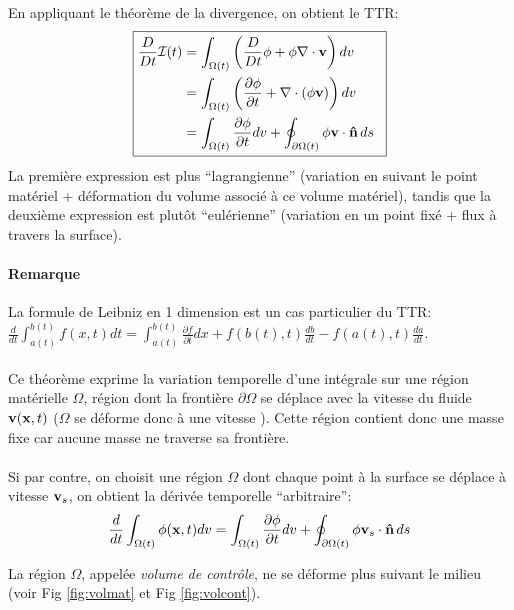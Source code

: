 En appliquant le théorème de la divergence, on obtient le TTR:
$$\boxed{
\begin{aligned}
\frac{D}{Dt}\mathcal{I}(t) &=\int_{\Omega (t)}\left(\frac{D}{Dt}\phi+\phi\nabla\cdot\textbf{v}\right)dv\qquad\\
 & =\int_{\Omega (t)}\left(\frac{\partial \phi}{\partial t}+\nabla\cdot(\phi\textbf{v})\right)dv\\
 & = \int_{\Omega (t)}\frac{\partial\phi}{\partial t}dv+\oint_{\partial \Omega (t)}\phi\textbf{v}\cdot\textbf{\^n}\,ds\\
\end{aligned}}$$
La première expression est plus ``lagrangienne'' (variation en suivant le point matériel + déformation du volume associé à ce volume matériel), tandis que la deuxième expression est plutôt ``eulérienne'' (variation en un point fixé + flux à travers la surface).
\paragraph{Remarque} La formule de Leibniz en 1 dimension est un cas particulier du TTR: $\frac{d}{dt}\int_{a(t)}^{b(t)}f(x,t)dt=\int_{a(t)}^{b(t)}\frac{\partial f}{\partial t}dx+f(b(t),t)\frac{db}{dt}-f(a(t),t)\frac{da}{dt}.$
\paragraph{}
Ce théorème exprime la variation temporelle d'une intégrale sur une région matérielle $\Omega$, région dont la frontière $\partial \Omega$ se déplace avec la vitesse du fluide $\textbf{v}(\textbf{x},t)$ ($\Omega$ se déforme donc à une vitesse ). Cette région contient donc une masse fixe car aucune masse ne traverse sa frontière.
\paragraph{}
Si par contre, on choisit une région $\Omega$ dont chaque point à la surface se déplace à vitesse $\textbf{v}_s$, on obtient la dérivée temporelle ``arbitraire'':
\begin{equation}
\frac{d}{dt}\int_{\Omega (t)}\phi(\textbf{x},t)dv=\int_{\Omega (t)}\frac{\partial \phi}{\partial t}dv+\oint_{\partial \Omega (t)}\phi\textbf{v}_s\cdot \textbf{\^n}\,ds
\end{equation}

La région $\Omega$, appelée \emph{volume de contrôle}, ne se déforme plus suivant le milieu (voir Fig \ref{fig:volmat} et Fig \ref{fig:volcont}).


